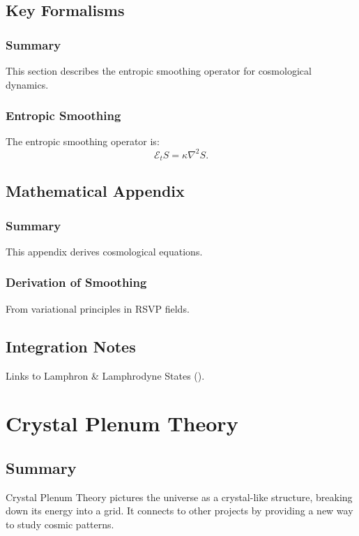\documentclass[11pt,oneside]{memoir}
\theoremstyle{plain}
\newcommand{\E}{\mathcal{E}}
\begin{document}
\section{Key Formalisms}
\subsection{Summary}
This section describes the entropic smoothing operator for cosmological dynamics.

\subsection{Entropic Smoothing}
The entropic smoothing operator is:
\begin{equation}
    \E_t S = \kappa \nabla^2 S.
\end{equation}

\section{Mathematical Appendix}
\subsection{Summary}
This appendix derives cosmological equations.

\subsection{Derivation of Smoothing}
From variational principles in RSVP fields.

\section{Integration Notes}
Links to Lamphron \& Lamphrodyne States ().

\chapter{Crystal Plenum Theory}
\label{sec:crystal_plenum}

\section{Summary}
Crystal Plenum Theory pictures the universe as a crystal-like structure, breaking down its energy into a grid. It connects to other projects by providing a new way to study cosmic patterns.
\end{document}
